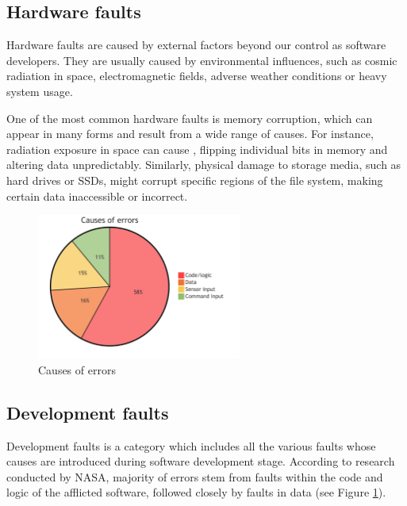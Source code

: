 \subsection{Hardware faults}

Hardware faults are caused by external factors beyond our control as software developers. They are usually caused by environmental influences, such as cosmic radiation in space, electromagnetic fields, adverse weather conditions or heavy system usage.

One of the most common hardware faults is memory corruption, which can appear in many forms and result from a wide range of causes. For instance, radiation exposure in space can cause , flipping individual bits in memory and altering data unpredictably. Similarly, physical damage to storage media, such as hard drives or SSDs, might corrupt specific regions of the file system, making certain data inaccessible or incorrect.


\begin{figure}[!hbt]
    \centering
    \includegraphics[width=0.6\textwidth]{diagrams/stats/piechart.png}
    \caption{Causes of errors \cite{nasa:stats}}
    \label{fig:nasa_stats}
\end{figure}

\subsection{Development faults}

Development faults is a category which includes all the various faults whose causes are introduced during software development stage. According to research conducted by NASA, majority of errors stem from faults within the code and logic of the afflicted software, followed closely by faults in data \cite{nasa:stats} (see Figure \ref{fig:nasa_stats}).

